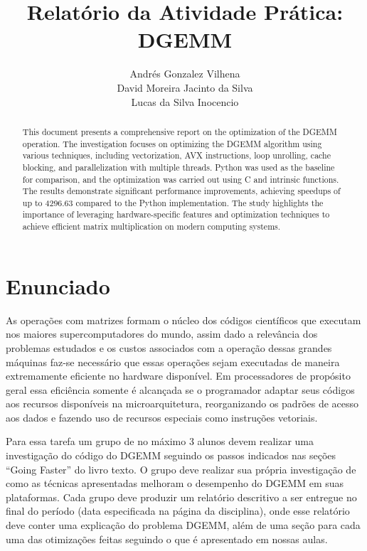 \documentclass[12pt]{article}
\title{Relatório da Atividade Prática: DGEMM}
\author{Andrés Gonzalez Vilhena\\
        David Moreira Jacinto da Silva\\
        Lucas da Silva Inocencio}
\begin{document}
\maketitle

\begin{abstract}
    This document presents a comprehensive report on the optimization of the DGEMM operation. The investigation focuses on optimizing the DGEMM algorithm using various techniques, including vectorization, AVX instructions, loop unrolling, cache blocking, and parallelization with multiple threads. Python was used as the baseline for comparison, and the optimization was carried out using C and intrinsic functions. The results demonstrate significant performance improvements, achieving speedups of up to 4296.63 compared to the Python implementation. The study highlights the importance of leveraging hardware-specific features and optimization techniques to achieve efficient matrix multiplication on modern computing systems.
\end{abstract}

\section{Enunciado}

As operações com matrizes formam o núcleo dos códigos científicos que executam nos maiores supercomputadores do mundo, assim dado a relevância dos problemas estudados e os custos associados com a operação dessas grandes máquinas faz-se necessário que essas operações sejam executadas de maneira extremamente eficiente no hardware disponível. Em processadores de propósito geral essa eficiência somente é alcançada se o programador adaptar seus códigos aos recursos disponíveis na microarquitetura, reorganizando os padrões de acesso aos dados e fazendo uso de recursos especiais como instruções vetoriais.

Para essa tarefa um grupo de no máximo 3 alunos devem realizar uma investigação do código do DGEMM seguindo os passos indicados nas seções “Going Faster” do livro texto. O grupo deve realizar sua própria investigação de como as técnicas apresentadas melhoram o desempenho do DGEMM em suas plataformas. Cada grupo deve produzir um relatório descritivo a ser entregue no final do período (data especificada na página da disciplina), onde esse relatório deve conter uma explicação do problema DGEMM, além de uma seção para cada uma das otimizações feitas seguindo o que é apresentado em nossas aulas.
\end{document}
